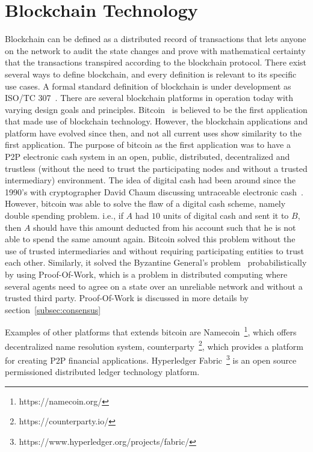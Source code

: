 \section{Blockchain Technology} \label{sec:blockchain}
Blockchain can be defined as a distributed record of transactions that lets
anyone on the network to audit the state changes and prove with mathematical
certainty that the transactions transpired according to the blockchain
protocol. There exist several ways to define blockchain, and every definition
is relevant to its specific use cases. A formal standard definition of
blockchain is under development as ISO/TC 307~\cite{ISOTC307}. There are
several blockchain platforms in operation today with varying design goals and
principles. Bitcoin~\cite{Bitcoin_Satoshi} is believed to be the first
application that made use of blockchain technology. However, the blockchain
applications and platform have evolved since then, and not all current uses
show similarity to the first application. The purpose of bitcoin as the first
application was to have a P2P electronic cash system in an open, public,
distributed, decentralized and trustless (without the need to trust the
participating nodes and without a trusted intermediary) environment. The idea
of digital cash had been around since the 1990's with cryptographer David Chaum
discussing untraceable electronic cash~\cite{chaum1988untraceable}. However,
bitcoin was able to solve the flaw of a digital cash scheme, namely double
spending problem. i.e., if $A$ had $10$ units of digital cash and sent it to
$B$, then $A$ should have this amount deducted from his account such that he is
not able to spend the same amount again. Bitcoin solved this problem without
the use of trusted intermediaries and without requiring participating entities
to trust each other.  Similarly, it solved the Byzantine General's
problem~\cite{lamport1982byzantine,miller2014anonymous} probabilistically by
using Proof-Of-Work, which is a problem in distributed computing where several
agents need to agree on a state over an unreliable network and without a
trusted third party. Proof-Of-Work is discussed in more details by
section~\ref{subsec:consensus} \par
Examples of other platforms that extends bitcoin are
Namecoin~\footnote{https://namecoin.org/}, which offers decentralized name
resolution system, counterparty~\footnote{https://counterparty.io/}, which
provides a platform for creating P2P financial applications. Hyperledger
Fabric~\footnote{https://www.hyperledger.org/projects/fabric/} is an open
source permissioned distributed ledger technology platform.
